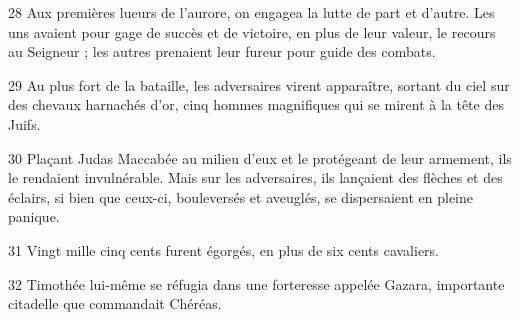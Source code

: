 
28 Aux premières lueurs de l’aurore, on engagea la lutte de part et d’autre. Les uns avaient pour gage de succès et de victoire, en plus de leur valeur, le recours au Seigneur ; les autres prenaient leur fureur pour guide des combats.

29 Au plus fort de la bataille, les adversaires virent apparaître, sortant du ciel sur des chevaux harnachés d’or, cinq hommes magnifiques qui se mirent à la tête des Juifs.

30 Plaçant Judas Maccabée au milieu d’eux et le protégeant de leur armement, ils le rendaient invulnérable. Mais sur les adversaires, ils lançaient des flèches et des éclairs, si bien que ceux-ci, bouleversés et aveuglés, se dispersaient en pleine panique.

31 Vingt mille cinq cents furent égorgés, en plus de six cents cavaliers.

32 Timothée lui-même se réfugia dans une forteresse appelée Gazara, importante citadelle que commandait Chéréas.